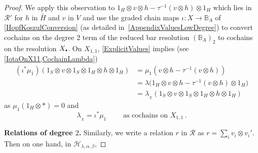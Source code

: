 \documentclass[11pt]{amsart}
\numberwithin{equation}{section}
\newcommand{\X}{_X}
\newcommand{\lambdax}{\lambda_{\X}}
\newcommand{\chabl}{\cH_{\lambda,\alpha,\beta}}
\newcommand{\R}{\mathcal{R}}
\newcommand{\sd}{_{\DOT}}%
\newcommand{\BB}{\mathbb{B}} %
\newcommand{\DOT}{\setlength{\unitlength}{1.2pt}\begin{picture}(2.5,2)
               (1,1)\put(2.5,2.5){\circle*{2}}\end{picture}}
\renewcommand{\_}[1]{\mbox{$_{\left( #1 \right)}$}}
\newcommand{\ot}{\otimes}
\newcommand{\cH}{\mathcal{H}}
\begin{document}
{\begin{proof}
 We apply this observation 
 to $1_H\ot v\ot h - \tau^{-1}(v\ot h)\ot 1_H$
 which lies in $\R'$
 for $h$ in $\bar H$ and $v$ in $V$
 and use the graded chain maps 
$\iota: X\rightarrow \BB_A$ of 
\cref{HopfKoszulConversion}
(as detailed in~\cref{AppendixValuesLowDegree})
to convert cochains
     on the degree 2 term of the reduced bar resolution
     $(\BB_{A})_2$
    to cochains
    on the resolution $X\sd$.
    On $X_{1,1}$, \cref{ExplicitValues} implies
    (see \cref{IotaOnX11,CochainLambda}) 
$$
    \begin{aligned}
    (\iota^*\mu_1)(1_S\ot v \ot 1_S\ot 1_H\ot h \ot 1_H)
    &= \mu_1(v\ot h-\tau^{-1}(v\ot h)) \\
    &=    \lambda\big(1_H\ot v\ot h - \tau^{-1}(v\ot h)\ot 1_H\big)\\
    &= \lambdax(1_S\ot v\ot 1_S\ot 1_H\ot h\ot 1_H) 
    \, 
    \end{aligned}
    $$
    as $\mu_1(1_H\ot *)=0$ and
    $$
    \lambdax =  \iota^* \mu_1
    \qquad\text{ as cochains on } X_{1,1}
    \, .
$$
      
{\bf Relations of degree $2$.}
    Similarly, 
we write a relation $r$ in $\R$ as $r=\sum_i v_i\ot v_i'$.
Then on one hand, in $\chabl$, 


\end{proof}}
\end{document}
